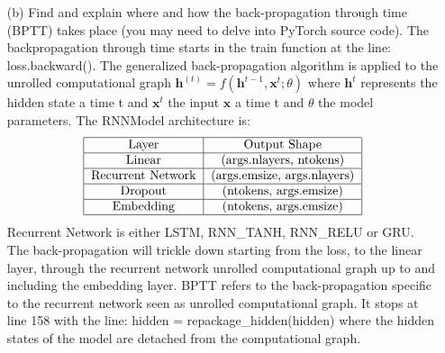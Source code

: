 \documentclass[11pt]{article}
\newcommand{\0}{\mat{0}}
\newcommand{\vect}[1]{\bm{#1}}     %
\begin{document}
\begin{itemize}
\begin{center}
    \end{center}
    
    \begin{center}
    \end{center}
    
   \item[(b)]
   Find and explain where and how the back-propagation through time (BPTT) takes place (you may need to delve into PyTorch source code). 
   The backpropagation through time starts in the train function at the line: loss.backward(). The generalized back-propagation algorithm is applied to the unrolled computational graph $\vect{h}^(t) = f(\vect{h}^{t-1}, \vect{x}^t; \theta)$ where $\vect{h}^t$ represents the hidden state a time t and $\vect{x}^t$ the input $\vect{x}$ a time t and $\theta$ the model parameters.
   The RNNModel architecture is:
   \[
  	 \begin{tabular}{| c | c | c |}
  	  \hline
	  \text{Layer} & \text{Output Shape}  \\
	  \hline
	  \text{Linear} & \text{(args.nlayers, ntokens)}  \\
	  \hline
	  \text{Recurrent Network} & \text{(args.emsize, args.nlayers)}  \\
	  \hline
	  \text{Dropout} & \text{(ntokens, args.emsize)} \\
	  \hline
	  \text{Embedding} & \text{(ntokens, args.emsize)}  \\
	  \hline
	\end{tabular}
\] 
Recurrent Network is either LSTM, RNN\_TANH, RNN\_RELU or GRU. The back-propagation will trickle down starting from the loss, to the linear layer, through the recurrent network unrolled computational graph up to and including the embedding layer. BPTT refers to the back-propagation specific to the recurrent network seen as unrolled computational graph. It stops at line 158 with the line: hidden = repackage\_hidden(hidden) where the hidden states of the model are detached from the computational graph.
	

\end{itemize}
\end{document}
